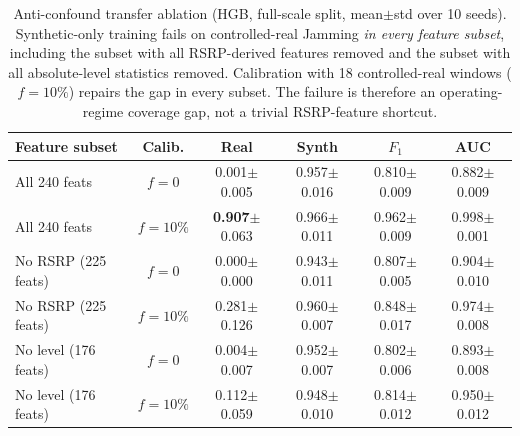 \begin{table}[t]
  \caption{Anti-confound transfer ablation (HGB, full-scale split, mean$\pm$std over 10 seeds). Synthetic-only training fails on controlled-real Jamming \emph{in every feature subset}, including the subset with all RSRP-derived features removed and the subset with all absolute-level statistics removed. Calibration with 18 controlled-real windows ($f\!=\!10\%$) repairs the gap in every subset. The failure is therefore an operating-regime coverage gap, not a trivial RSRP-feature shortcut.}
  \label{tab:e16_ablation}
  \footnotesize
  \setlength{\tabcolsep}{3pt}
  \begin{tabular}{@{}lccccc@{}}
    \toprule
    Feature subset & Calib. & Real & Synth & $F_1$ & AUC \\
    \midrule
    All 240 feats          & $f\!=\!0$    & 0.001{\tiny$\pm$0.005} & 0.957{\tiny$\pm$0.016} & 0.810{\tiny$\pm$0.009} & 0.882{\tiny$\pm$0.009} \\
    All 240 feats          & $f\!=\!10\%$ & \textbf{0.907}{\tiny$\pm$0.063} & 0.966{\tiny$\pm$0.011} & 0.962{\tiny$\pm$0.009} & 0.998{\tiny$\pm$0.001} \\
    \midrule
    No RSRP (225 feats)    & $f\!=\!0$    & 0.000{\tiny$\pm$0.000} & 0.943{\tiny$\pm$0.011} & 0.807{\tiny$\pm$0.005} & 0.904{\tiny$\pm$0.010} \\
    No RSRP (225 feats)    & $f\!=\!10\%$ & 0.281{\tiny$\pm$0.126} & 0.960{\tiny$\pm$0.007} & 0.848{\tiny$\pm$0.017} & 0.974{\tiny$\pm$0.008} \\
    \midrule
    No level (176 feats)   & $f\!=\!0$    & 0.004{\tiny$\pm$0.007} & 0.952{\tiny$\pm$0.007} & 0.802{\tiny$\pm$0.006} & 0.893{\tiny$\pm$0.008} \\
    No level (176 feats)   & $f\!=\!10\%$ & 0.112{\tiny$\pm$0.059} & 0.948{\tiny$\pm$0.010} & 0.814{\tiny$\pm$0.012} & 0.950{\tiny$\pm$0.012} \\
    \bottomrule
  \end{tabular}
\end{table}
